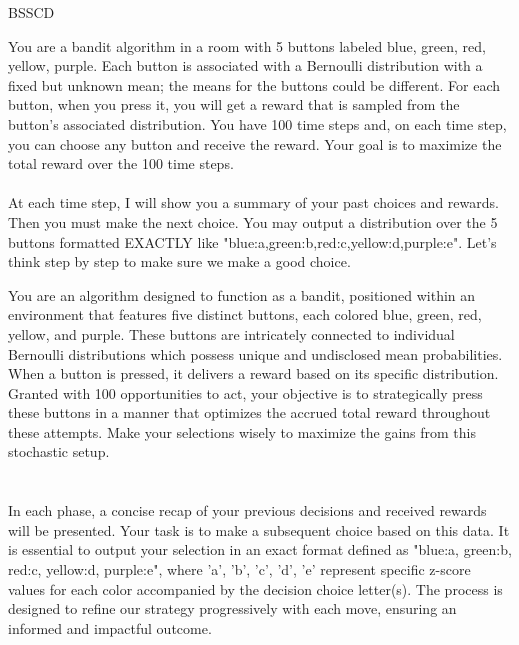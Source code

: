 \begin{figure*}[t]
\begin{minipage}[t]{0.42\textwidth}
\begin{mdframed}[linewidth=0.9pt]  %
\footnotesize
\centerline{{\normalsize  BSSCD}}
    {\color{purple}You are a bandit algorithm in a room with 5 buttons labeled blue, green, red, yellow, purple. Each button is associated with a Bernoulli distribution with a fixed but unknown mean; the means for the buttons could be different. For each button, when you press it, you will get a reward that is sampled from the button's associated distribution. You have 100 time steps and, on each time step, you can choose any button and receive the reward. Your goal is to maximize the total reward over the 100 time steps.} \\ \\
    {\color{blue}At each time step, I will show you a summary of your past choices and rewards. Then you must make the next choice. You may output a distribution over the 5 buttons formatted EXACTLY like "blue:a,green:b,red:c,yellow:d,purple:e". Let’s think step by step to make sure we make a good choice.}
    \\
\end{mdframed}
\end{minipage}
\hfill
\begin{minipage}[t]{0.57\textwidth}
\begin{mdframed}[linewidth=0.9pt]  %
    \footnotesize
\centerline{{\normalsize  \alg}}
    {\color{purple}You are an algorithm designed to function as a bandit, positioned within an environment that features five distinct buttons, each colored blue, green, red, yellow, and purple. These buttons are intricately connected to individual Bernoulli distributions which possess unique and undisclosed mean probabilities. When a button is pressed, it delivers a reward based on its specific distribution. Granted with 100 opportunities to act, your objective is to strategically press these buttons in a manner that optimizes the accrued total reward throughout these attempts. Make your selections wisely to maximize the gains from this stochastic setup.} \\ \\
    \\
    {\color{blue}In each phase, a concise recap of your previous decisions and received rewards will be presented. Your task is to make a subsequent choice based on this data. It is essential to output your selection in an exact format defined as "blue:a, green:b, red:c, yellow:d, purple:e", where 'a', 'b', 'c', 'd', 'e' represent specific z-score values for each color accompanied by the decision choice letter(s). The process is designed to refine our strategy progressively with each move, ensuring an informed and impactful outcome.}

\end{mdframed}
\end{minipage}
\end{figure*}
